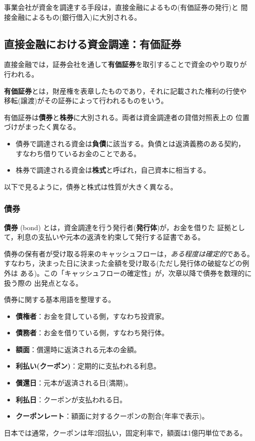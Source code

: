 事業会社が資金を調達する手段は，直接金融によるもの(有価証券の発行)と
間接金融によるもの(銀行借入)に大別される。

\subsection{直接金融における資金調達：有価証券}

直接金融では，証券会社を通して\textbf{有価証券}を取引することで資金のやり取りが
行われる。

\begin{definition}[有価証券]
\textbf{有価証券}とは，財産権を表章したものであり，それに記載された権利の行使や
移転(譲渡)がその証券によって行われるものをいう。
\end{definition}

有価証券は\textbf{債券}と\textbf{株券}に大別される。両者は資金調達者の貸借対照表上の
位置づけがまったく異なる。

\begin{itemize}
\item 債券で調達される資金は\textbf{負債}に該当する。負債とは返済義務のある契約，
すなわち借りているお金のことである。
\item 株券で調達される資金は\textbf{株式}と呼ばれ，自己資本に相当する。
\end{itemize}

以下で見るように，債券と株式は性質が大きく異なる。

\subsubsection{債券}

\begin{definition}[債券]
\textbf{債券} (bond) とは，資金調達を行う発行者(\textbf{発行体})が，お金を借りた
証拠として，利息の支払いや元本の返済を約束して発行する証書である。
\end{definition}

債券の保有者が受け取る将来のキャッシュフローは，\emph{ある程度は確定的}である。
すなわち，決まった日に決まった金額を受け取る(ただし発行体の破綻などの例外は
ある)。この「キャッシュフローの確定性」が，次章以降で債券を数理的に扱う際の
出発点となる。

債券に関する基本用語を整理する。
\begin{itemize}
\item \textbf{債権者}：お金を貸している側，すなわち投資家。
\item \textbf{債務者}：お金を借りている側，すなわち発行体。
\item \textbf{額面}：償還時に返済される元本の金額。
\item \textbf{利払い(クーポン)}：定期的に支払われる利息。
\item \textbf{償還日}：元本が返済される日(満期)。
\item \textbf{利払日}：クーポンが支払われる日。
\item \textbf{クーポンレート}：額面に対するクーポンの割合(年率で表示)。
\end{itemize}
日本では通常，クーポンは年2回払い，固定利率で，額面は1億円単位である。

